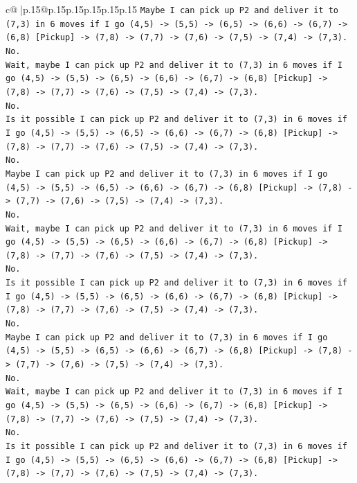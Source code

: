 \documentclass{article}
\begin{document}
{\begin{supertabular}{c@{$\;$}|p{.15\linewidth}@{}p{.15\linewidth}p{.15\linewidth}p{.15\linewidth}p{.15\linewidth}p{.15\linewidth}}
{{{\texttt{Maybe I can pick up P2 and deliver it to (7,3) in 6 moves if I go (4,5) {-}> (5,5) {-}> (6,5) {-}> (6,6) {-}> (6,7) {-}> (6,8) {[}Pickup{]} {-}> (7,8) {-}> (7,7) {-}> (7,6) {-}> (7,5) {-}> (7,4) {-}> (7,3).} \\
\texttt{No.} \\
\texttt{Wait, maybe I can pick up P2 and deliver it to (7,3) in 6 moves if I go (4,5) {-}> (5,5) {-}> (6,5) {-}> (6,6) {-}> (6,7) {-}> (6,8) {[}Pickup{]} {-}> (7,8) {-}> (7,7) {-}> (7,6) {-}> (7,5) {-}> (7,4) {-}> (7,3).} \\
\texttt{No.} \\
\texttt{Is it possible I can pick up P2 and deliver it to (7,3) in 6 moves if I go (4,5) {-}> (5,5) {-}> (6,5) {-}> (6,6) {-}> (6,7) {-}> (6,8) {[}Pickup{]} {-}> (7,8) {-}> (7,7) {-}> (7,6) {-}> (7,5) {-}> (7,4) {-}> (7,3).} \\
\texttt{No.} \\
\texttt{Maybe I can pick up P2 and deliver it to (7,3) in 6 moves if I go (4,5) {-}> (5,5) {-}> (6,5) {-}> (6,6) {-}> (6,7) {-}> (6,8) {[}Pickup{]} {-}> (7,8) {-}> (7,7) {-}> (7,6) {-}> (7,5) {-}> (7,4) {-}> (7,3).} \\
\texttt{No.} \\
\texttt{Wait, maybe I can pick up P2 and deliver it to (7,3) in 6 moves if I go (4,5) {-}> (5,5) {-}> (6,5) {-}> (6,6) {-}> (6,7) {-}> (6,8) {[}Pickup{]} {-}> (7,8) {-}> (7,7) {-}> (7,6) {-}> (7,5) {-}> (7,4) {-}> (7,3).} \\
\texttt{No.} \\
\texttt{Is it possible I can pick up P2 and deliver it to (7,3) in 6 moves if I go (4,5) {-}> (5,5) {-}> (6,5) {-}> (6,6) {-}> (6,7) {-}> (6,8) {[}Pickup{]} {-}> (7,8) {-}> (7,7) {-}> (7,6) {-}> (7,5) {-}> (7,4) {-}> (7,3).} \\
\texttt{No.} \\
\texttt{Maybe I can pick up P2 and deliver it to (7,3) in 6 moves if I go (4,5) {-}> (5,5) {-}> (6,5) {-}> (6,6) {-}> (6,7) {-}> (6,8) {[}Pickup{]} {-}> (7,8) {-}> (7,7) {-}> (7,6) {-}> (7,5) {-}> (7,4) {-}> (7,3).} \\
\texttt{No.} \\
\texttt{Wait, maybe I can pick up P2 and deliver it to (7,3) in 6 moves if I go (4,5) {-}> (5,5) {-}> (6,5) {-}> (6,6) {-}> (6,7) {-}> (6,8) {[}Pickup{]} {-}> (7,8) {-}> (7,7) {-}> (7,6) {-}> (7,5) {-}> (7,4) {-}> (7,3).} \\
\texttt{No.} \\
\texttt{Is it possible I can pick up P2 and deliver it to (7,3) in 6 moves if I go (4,5) {-}> (5,5) {-}> (6,5) {-}> (6,6) {-}> (6,7) {-}> (6,8) {[}Pickup{]} {-}> (7,8) {-}> (7,7) {-}> (7,6) {-}> (7,5) {-}> (7,4) {-}> (7,3).} \\
}}}
\end{supertabular}}
\end{document}
